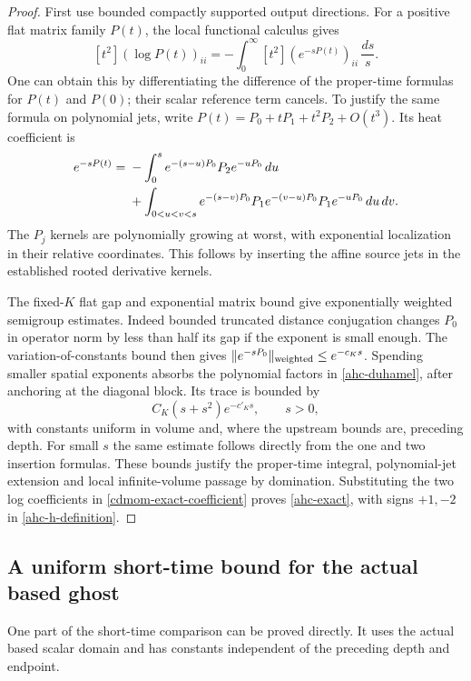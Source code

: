 \begin{proof}
First use bounded compactly supported output directions.
For a positive flat matrix family \(P(t)\), the local
functional calculus gives
\[
 [t^2](\log P(t))_{ii}
    =-\int_0^\infty [t^2](e^{-sP(t)})_{ii}\,\frac{ds}{s}.
\]
One can obtain this by differentiating the difference
of the proper-time formulas for \(P(t)\) and \(P(0)\);
their scalar reference term cancels.
To justify the same formula on polynomial jets, write
\(P(t)=P_0+tP_1+t^2P_2+O(t^3)\). Its heat coefficient is
\begin{align}
 [t^2]e^{-sP(t)}
 ={}&-\int_0^s e^{-(s-u)P_0}P_2e^{-uP_0}\,du \notag\\
 &+\int_{0<u<v<s}
 e^{-(s-v)P_0}P_1e^{-(v-u)P_0}P_1e^{-uP_0}\,du\,dv .
 \label{ahc-duhamel}
\end{align}
The \(P_j\) kernels are polynomially growing at worst,
with exponential localization in their relative
coordinates. This follows by inserting the affine
source jets in the established rooted derivative kernels.

The fixed-\(K\) flat gap and exponential matrix bound
give exponentially weighted semigroup estimates.
Indeed bounded truncated distance conjugation changes
\(P_0\) in operator norm by less than half its gap if
the exponent is small enough. The variation-of-constants
bound then gives
\(\|e^{-sP_0}\|_{\rm weighted}\le e^{-c_Ks}\).
Spending smaller spatial exponents absorbs the
polynomial factors in \eqref{ahc-duhamel}, after
anchoring at the diagonal block. Its trace is bounded by
\[
 C_K(s+s^2)e^{-c'_Ks},\qquad s>0,
\]
with constants uniform in volume and, where the
upstream bounds are, preceding depth. For small \(s\)
the same estimate follows directly from the one and
two insertion formulas. These bounds justify the
proper-time integral, polynomial-jet extension and
local infinite-volume passage by domination.
Substituting the two log coefficients in
\eqref{cdmom-exact-coefficient} proves
\eqref{ahc-exact}, with signs \(+1,-2\) in
\eqref{ahc-h-definition}.
\end{proof}

\subsection{A uniform short-time bound for the actual based ghost}
\label{ahc-ghost-short-section}

One part of the short-time comparison can be proved directly.
It uses the actual based scalar domain and has constants
independent of the preceding depth and endpoint.

